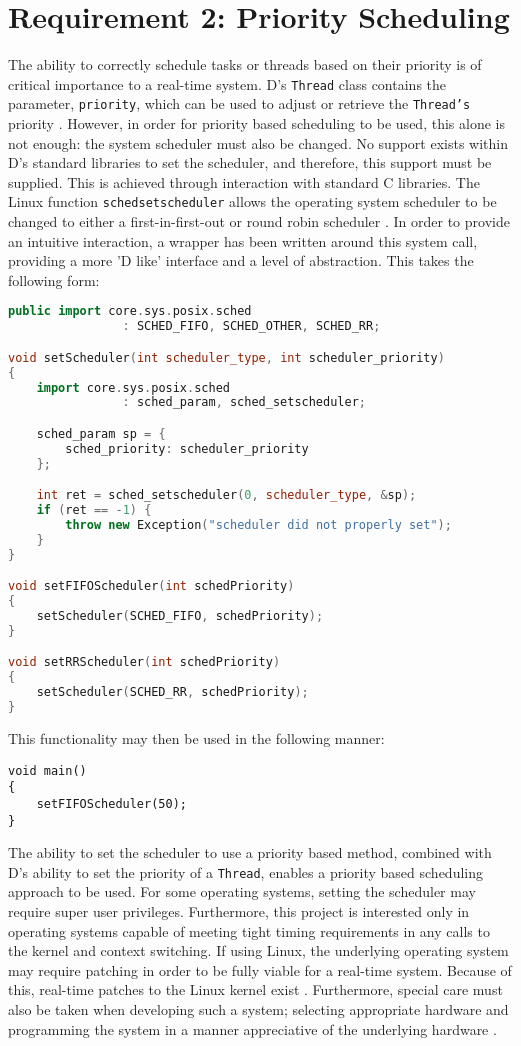 \section{Requirement 2: Priority Scheduling}
The ability to correctly schedule tasks or threads based on their priority is of 
critical importance to a real-time system. D's \texttt{Thread} class contains the
parameter, \texttt{priority}, which can be used to adjust or retrieve 
the \texttt{Thread's} priority \cite{core-thread}. 
However, in order for priority based scheduling to be used, this alone is not 
enough: the system scheduler must also be changed.
No support exists within D's standard libraries to set the scheduler, and therefore, 
this support must be supplied. 
This is achieved through interaction with standard C libraries. 
The Linux function \texttt{sched\textunderscore{}setscheduler} allows the operating system 
scheduler to be changed to either a first-in-first-out or round robin scheduler \cite{sched-setscheduler}. 
In order to provide an intuitive interaction, a wrapper has been written around
this system call, providing a more 'D like' interface and a level of
abstraction. This takes the following form:
\begin{lstlisting}[basicstyle=\small,language=C++]
public import core.sys.posix.sched 
                : SCHED_FIFO, SCHED_OTHER, SCHED_RR; 

void setScheduler(int scheduler_type, int scheduler_priority)
{
    import core.sys.posix.sched 
                : sched_param, sched_setscheduler; 

    sched_param sp = { 
        sched_priority: scheduler_priority 
    }; 

    int ret = sched_setscheduler(0, scheduler_type, &sp); 
    if (ret == -1) {
        throw new Exception("scheduler did not properly set");
    }
}

void setFIFOScheduler(int schedPriority)
{
    setScheduler(SCHED_FIFO, schedPriority);
}

void setRRScheduler(int schedPriority)
{
    setScheduler(SCHED_RR, schedPriority); 
}
\end{lstlisting}
This functionality may then be used in the following manner: 
\begin{lstlisting}[basicstyle=\small]
void main()
{
    setFIFOScheduler(50); 
}
\end{lstlisting}
The ability to set the scheduler to use a priority based method, combined with 
D's ability to set the priority of a \texttt{Thread}, enables a 
priority based scheduling approach to be used. 
For some operating systems, setting the scheduler may require super user privileges. 
Furthermore, this project is interested only in operating systems capable of meeting tight timing 
requirements in any calls to the kernel and context switching.
If using Linux, the underlying operating system may require patching in order 
to be fully viable for a real-time system. Because of this, real-time patches 
to the Linux kernel exist \cite{rt-wiki}. 
Furthermore, special care must also be taken when developing such a system;
selecting appropriate hardware and programming the system in a manner appreciative 
of the underlying hardware \cite{rt-wiki-how-to}.


